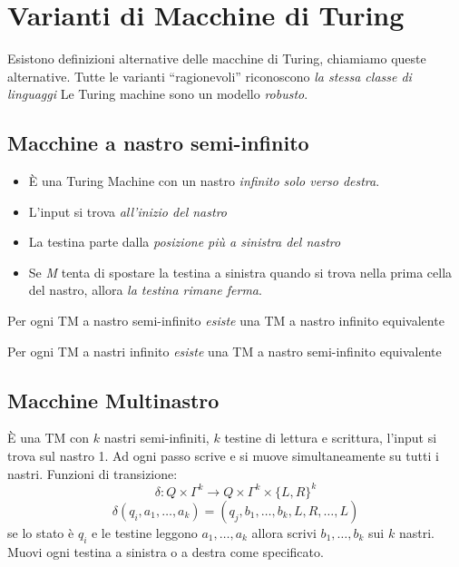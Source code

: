 \section{Varianti di Macchine di Turing}
Esistono definizioni alternative delle macchine di Turing, chiamiamo   queste alternative.
Tutte le varianti ``ragionevoli'' riconoscono \textit{la stessa classe di linguaggi}
Le Turing machine sono un modello \textit{robusto}.

\subsection{Macchine a nastro semi-infinito}

\begin{itemize}
   \item È una Turing Machine con un nastro \textit{infinito solo verso destra}.
   \item L'input si trova \textit{all'inizio del nastro}
   \item La testina parte dalla \textit{posizione più a sinistra del nastro}
   \item Se \textit{M} tenta di spostare la testina a sinistra quando si trova nella prima cella del nastro, allora \textit{la testina rimane ferma}.
\end{itemize}
\begin{theorem}
   \item Per ogni TM a nastro semi-infinito \textit{esiste} una TM a nastro infinito equivalente
   \item Per ogni TM a nastri infinito \textit{esiste} una TM a nastro semi-infinito equivalente
\end{theorem}

\subsection{Macchine Multinastro}
È una TM con $k$ nastri semi-infiniti, $k$ testine di lettura e scrittura, l'input si trova sul nastro 1.
Ad ogni passo scrive e si muove simultaneamente su tutti i nastri. 
Funzioni di transizione: 
$$\delta:Q\times\Gamma^k\rightarrow Q\times\Gamma^k\times\{L, R\}^k$$
$$\delta(q_i, a_1,\dots, a_k)=(q_j, b_1, \dots, b_k,L,R,\dots, L)$$
se lo stato è $q_i$ e le testine leggono $a_1, \dots, a_k$ allora scrivi $b_1,\dots, b_k$ sui $k$ nastri.
Muovi ogni testina a sinistra o a destra come specificato.

